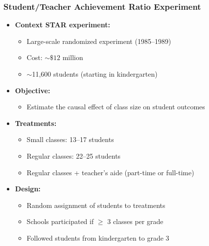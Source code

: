 \documentclass[12pt, compress]{beamer}
\begin{document}
\begin{frame}
	\frametitle{Student/Teacher Achievement Ratio Experiment}

\begin{itemize}
	\item \textbf{Context STAR experiment:}
	\begin{itemize}
		\item Large-scale randomized experiment (1985--1989)
		\item Cost: $\sim\$12$ million
		\item $\sim$11,600 students (starting in kindergarten)
	\end{itemize}
	
	\medskip
	
	\item \textbf{Objective:}
	\begin{itemize}
		\item Estimate the causal effect of class size on student outcomes
	\end{itemize}
	
	\medskip
	
	\item \textbf{Treatments:}
	\begin{itemize}
		\item Small classes: 13--17 students
		\item Regular classes: 22--25 students
		\item Regular classes + teacher’s aide (part-time or full-time)
	\end{itemize}
	
	\medskip
	
	\item \textbf{Design:}
	\begin{itemize}
		\item Random assignment of students to treatments
		\item Schools participated if $\geq$ 3 classes per grade
		\item Followed students from kindergarten to grade 3
	\end{itemize}

\end{itemize}

\end{frame}
\end{document}
